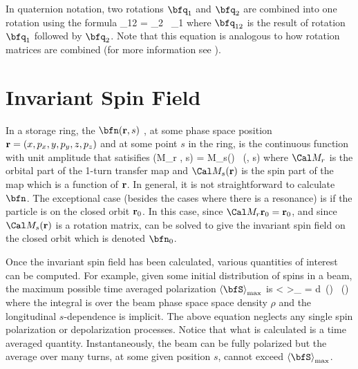 {In quaternion notation, two rotations $\bfq_1$ and $\bfq_2$ are combined into one rotation using the formula
\Begineq
  \bfq_{12} = \bfq_2 \, \bfq_1
\Endeq
where $\bfq_{12}$ is the result of rotation $\bfq_1$ followed by $\bfq_2$. Note that this equation
is analogous to how rotation matrices are combined (for more information see \cite{b:quat}).

\section{Invariant Spin Field}
\label{s:isf}

In a storage ring, the  $\bfn(\bfr, s)$
\cite{b:spin.hoff,b:duan15}, at some phase space position ${\bf r} = (x, p_x, y, p_y, z, p_z)$ and at
some point $s$ in the ring, is the continuous function with unit amplitude that satisifies
\Begineq
  \bfn(\Cal M_r \bfr, s) = \Cal M_s(\bfr) \, \bfn(\bfr, s)
  \label{nmrs}
\Endeq
where $\Cal M_r$ is the orbital part of the 1-turn transfer map and $\Cal M_s(\bfr)$ is the spin
part of the map which is a function of ${\bf r}$. In general, it is not straightforward to calculate
$\bfn$. The exceptional case (besides the cases where there is a resonance) is if the particle is on
the closed orbit ${\bf r}_0$. In this case, since $\Cal M_r \bfr_0 = \bfr_0$, and since $\Cal M_s(\bfr)$
is a rotation matrix,  can be solved to give the invariant spin field on the closed orbit
which is denoted $\bfn_0$.

Once the invariant spin field has been calculated, various quantities of interest can be
computed. For example, given some initial distribution of spins in a beam, the maximum possible time
averaged polarization $\left< \bfS \right>_{\max}$ is
\Begineq
  \left< \bfS \right>_{\max} = \int d\bfr \, \rho(\bfr) \, \bfn(\bfr)
\Endeq
where the integral is over the beam phase space space density $\rho$ and the longitudinal
$s$-dependence is implicit. The above equation neglects any single spin polarization or
depolarization processes. Notice that what is calculated is a time averaged quantity.
Instantaneously, the beam can be fully polarized but the average over many turns, at some given
position $s$, cannot exceed $\left< \bfS \right>_{\max}$.

}

